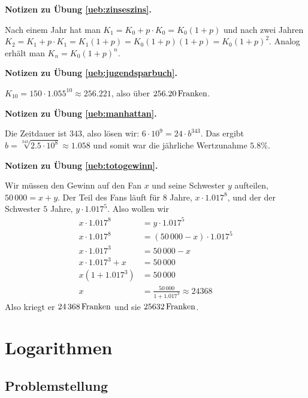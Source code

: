 \documentclass[%
11pt,%
twoside,%
titlepage,%
swissgerman,%
headsepline%
]{scrartcl}
\newcommand{\faReturnGray}{\textcolor{gray}{\faMailReply}} %
\theoremstyle{definition}
\theoremstyle{plain}
\newcommand{\concatueb}[1]{ueb:#1}%
\newcommand{\concatlsg}[1]{lsg:#1}%
\newenvironment{lsg}[1]{%
    \par\noindent\textbf{Notizen zu Übung \ref{\concatueb{#1}}.}%
    \label{\concatlsg{#1}} %
    \hfill\hyperref[\concatueb{#1}]{\faReturnGray}\par %
}{%
    \par%
}
\begin{document}
\begin{lsg}{zinseszins}
    Nach einem Jahr hat man $K_1=K_0+p\cdot K_0=K_0(1+p)$ und nach zwei Jahren $K_2=K_1+p\cdot K_1=K_1(1+p)=K_0(1+p)(1+p)=K_0(1+p)^2$. Analog erhält man $K_n=K_0(1+p)^n$.
\end{lsg}

\begin{lsg}{jugendsparbuch}
    $K_{10}=150\cdot1.055^{10}\approx256.221$, also über $\unit[256.20]{Franken}$.
\end{lsg}

\begin{lsg}{manhattan}
    Die Zeitdauer ist $343$, also lösen wir: $6\cdot10^9=24\cdot b^{343}$. Das ergibt $b=\sqrt[343]{2.5\cdot10^8}\approx1.058$ und somit war die jährliche Wertzunahme $5.8\%$.
\end{lsg}

\begin{lsg}{totogewinn}
    Wir müssen den Gewinn auf den Fan $x$ und seine Schwester $y$ aufteilen, $50\,000=x+y$. Der Teil des Fans läuft für $8$ Jahre, $x\cdot 1.017^8$, und der der Schwester $5$ Jahre, $y\cdot 1.017^5$. Also wollen wir
    \begin{align*}
        x\cdot 1.017^8 &= y\cdot 1.017^5\\
        x\cdot 1.017^8 &= (50\,000-x)\cdot 1.017^5\tag{$\div1.017^5$}\\
        x\cdot 1.017^3 &= 50\,000-x\tag{$+x$}\\
        x\cdot 1.017^3+x &= 50\,000\tag{$+x$}\\
        x(1+1.017^3) &= 50\,000\tag{$\div(1+1.017^3)$}\\
        x &= \frac{50\,000}{1+1.017^3}\approx24368
    \end{align*}
    Also kriegt er $\unit[24\,368]{Franken}$ und sie $\unit[25632]{Franken}$.
\end{lsg}

\clearpage

\section{Logarithmen}
\subsection{Problemstellung}
\end{document}
